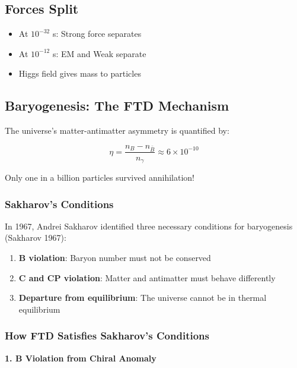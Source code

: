 \documentclass[
  11pt,
  letterpaper,
  twoside,
  openright]{book}
\providecommand{\tightlist}{%
  \setlength{\itemsep}{0pt}\setlength{\parskip}{0pt}}
\begin{document}
\subsection{Forces Split}\label{forces-split}

\begin{itemize}
\tightlist
\item
  At \(10^{-32}\) s: Strong force separates
\item
  At \(10^{-12}\) s: EM and Weak separate
\item
  Higgs field gives mass to particles
\end{itemize}

\subsection{Baryogenesis: The FTD
Mechanism}\label{baryogenesis-the-ftd-mechanism}

The universe's matter-antimatter asymmetry is quantified by:

\[\eta = \frac{n_B - n_{\bar{B}}}{n_\gamma} \approx 6 \times 10^{-10}\]

Only one in a billion particles survived annihilation!

\subsubsection{Sakharov's Conditions}\label{sakharovs-conditions}

In 1967, Andrei Sakharov identified three necessary conditions for
baryogenesis (Sakharov 1967):

\begin{enumerate}
\def\labelenumi{\arabic{enumi}.}
\tightlist
\item
  \textbf{B violation}: Baryon number must not be conserved
\item
  \textbf{C and CP violation}: Matter and antimatter must behave
  differently
\item
  \textbf{Departure from equilibrium}: The universe cannot be in thermal
  equilibrium
\end{enumerate}

\subsubsection{How FTD Satisfies Sakharov's
Conditions}\label{how-ftd-satisfies-sakharovs-conditions}

\textbf{1. B Violation from Chiral Anomaly}
\end{document}

